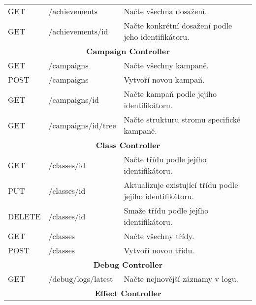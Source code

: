 \begin{longtable}{|l|l|p{}|}
    \hline
    GET             & /achievements               & Načte všechna dosažení.                                             \\
    GET             & /achievements/{id}          & Načte konkrétní dosažení podle jeho identifikátoru.                 \\
    \hline
    \multicolumn{3}{|c|}{\textbf{Campaign Controller}}                                                                  \\
    \hline
    GET             & /campaigns                  & Načte všechny kampaně.                                              \\
    POST            & /campaigns                  & Vytvoří novou kampaň.                                               \\
    GET             & /campaigns/{id}             & Načte kampaň podle jejího identifikátoru.                           \\
    GET             & /campaigns/{id}/tree        & Načte strukturu stromu specifické kampaně.                          \\
    \hline
    \multicolumn{3}{|c|}{\textbf{Class Controller}}                                                                     \\
    \hline
    GET             & /classes/{id}               & Načte třídu podle jejího identifikátoru.                            \\
    PUT             & /classes/{id}               & Aktualizuje existující třídu podle jejího identifikátoru.           \\
    DELETE          & /classes/{id}               & Smaže třídu podle jejího identifikátoru.                            \\
    GET             & /classes                    & Načte všechny třídy.                                                \\
    POST            & /classes                    & Vytvoří novou třídu.                                                \\
    \hline
    \multicolumn{3}{|c|}{\textbf{Debug Controller}}                                                                     \\
    \hline
    GET             & /debug/logs/latest          & Načte nejnovější záznamy v logu.                                    \\
    \hline
    \multicolumn{3}{|c|}{\textbf{Effect Controller}}                                                                    \\

\end{longtable}
